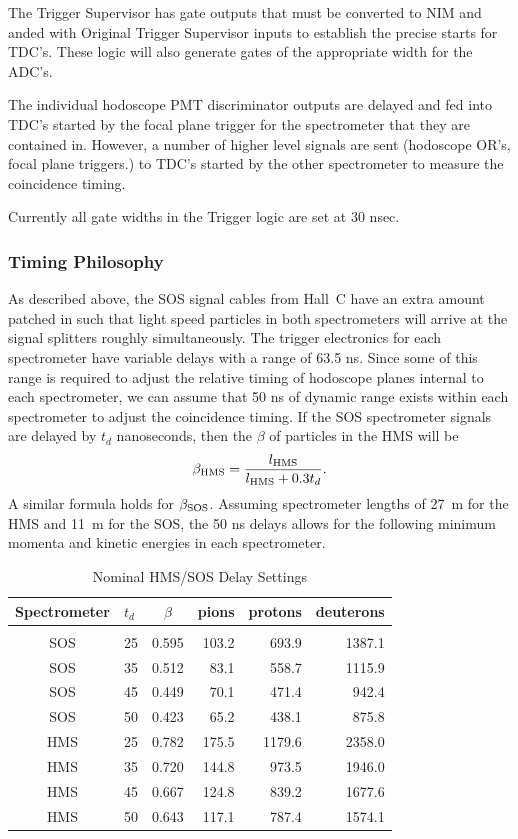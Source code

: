 The Trigger Supervisor has gate outputs that must be converted to NIM and
anded with Original Trigger Supervisor inputs to establish the precise
starts for TDC's. These logic will also generate gates of the appropriate
width for the ADC's.

The individual hodoscope PMT discriminator outputs are delayed and fed
into TDC's started by the focal plane trigger for the spectrometer that they
are contained in.  However, a number of higher level signals are sent
(hodoscope OR's, focal plane triggers.) to TDC's started by the other
spectrometer to measure the coincidence timing.

Currently all gate widths in the Trigger logic are set at
30 nsec.  %

\subsubsection{Timing Philosophy}

As described above, the SOS signal cables from Hall~C have an extra
amount patched in such that light speed particles in both spectrometers
will arrive at the signal splitters roughly simultaneously. The trigger
electronics for each spectrometer have variable delays with a range of 63.5
ns. Since some of this range is required to adjust the relative timing of
hodoscope planes internal to each spectrometer, we can assume that 50 ns
of dynamic range exists within each spectrometer to adjust the
coincidence timing. If the SOS spectrometer signals are delayed by $t_d$
nanoseconds, then the $\beta$ of particles in the HMS will be
$$\beta_{\rm HMS} = \frac{l_{\rm HMS}}{l_{\rm HMS} + 0.3 t_d}.$$
A similar formula holds for $\beta_{\rm SOS}$.
Assuming spectrometer lengths of 27~m for the HMS and
11~m for the SOS, the 50 ns delays allows for the following minimum momenta
and  kinetic energies in each spectrometer.

\begin{table}
\caption{Nominal HMS/SOS Delay Settings\label{tab:delays}}
\begin{center}
\begin{tabular}{clcrrr}
Spectrometer&$t_d$&$\beta$&pions&protons&deuterons\\
\hline\\
SOS&25&0.595&103.2&693.9&1387.1\\
SOS&35&0.512&83.1&558.7&1115.9\\
SOS&45&0.449&70.1&471.4&942.4\\
SOS&50&0.423&65.2&438.1&875.8\\
HMS&25&0.782&175.5&1179.6&2358.0\\
HMS&35&0.720&144.8&973.5&1946.0\\
HMS&45&0.667&124.8&839.2&1677.6\\
HMS&50&0.643&117.1&787.4&1574.1\\
\end{tabular}
\end{center}
\end{table}

